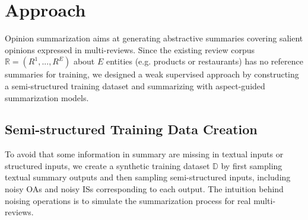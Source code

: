 \section{Approach}
\label{sec:approach}
Opinion summarization aims at generating abstractive 
summaries covering salient opinions expressed in multi-reviews.
Since the existing review corpus  $\mathbb{R}=(R^1, ..., R^E)$ about $E$ entities (e.g. products or restaurants) has no
reference summaries for training, we designed a weak supervised approach by constructing a semi-structured training dataset and summarizing with aspect-guided summarization models.


\subsection{Semi-structured Training Data Creation}
\label{sec:data}
To avoid that some information in summary are missing in textual inputs or structured inputs,
we create a synthetic training dataset $\mathbb{D}$ 
by first sampling textual summary outputs and then sampling semi-structured inputs, including noisy OAs and noisy ISs corresponding to each output. The  intuition behind noising operations is to simulate the summarization process for real multi-reviews.

